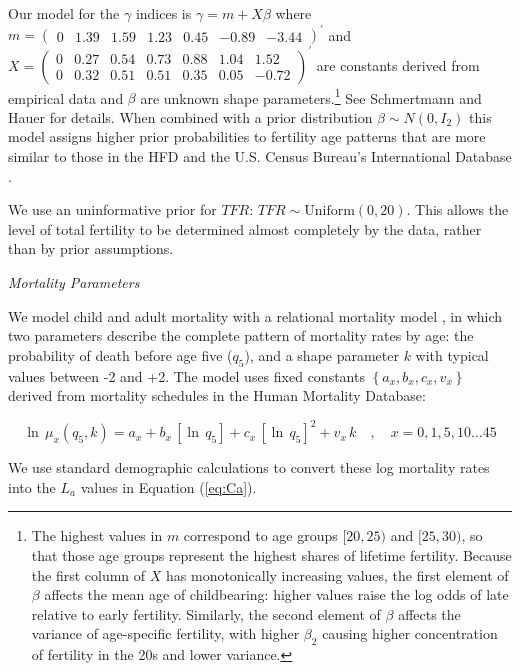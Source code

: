 \documentclass[12pt]{article}
\begin{document}
Our model for the \(\gamma\) indices is \(\gamma=m+X\beta\) where
\(m=(\begin{smallmatrix} 0 &1.39 &1.59 &1.23 &0.45 &-0.89 &-3.44\end{smallmatrix})^\prime\)
and
\(X= \left(\begin{smallmatrix}0 & 0.27 & 0.54 & 0.73 & 0.88 & 1.04 & 1.52\\0 & 0.32 & 0.51 & 0.51 & 0.35 & 0.05 & -0.72 \end{smallmatrix}\right)^{\prime}\)
are constants derived from empirical data and \(\beta\) are unknown
shape
parameters.\footnote{The highest values in $m$ correspond to age groups $[20,25)$ and $[25,30)$, so that those age groups represent the highest shares of lifetime fertility. Because the first column of $X$ has monotonically increasing values, the first element of $\beta$ affects the mean age of childbearing: higher values raise the log odds of late relative to early fertility. Similarly, the second element of $\beta$ affects the variance of age-specific fertility, with higher $\beta_2$ causing higher concentration of fertility in the 20s and lower variance.}
See Schmertmann and Hauer \citeyearpar{schmertmann2019bayesian} for
details. When combined with a prior distribution \(\beta\sim N(0,I_2)\)
this model assigns higher prior probabilities to fertility age patterns
that are more similar to those in the HFD and the U.S. Census Bureau's
International Database \citep{CensusIDB}.

We use an uninformative prior for \(TFR\):
\(TFR\sim \text{Uniform}(0,20)\). This allows the level of total
fertility to be determined almost completely by the data, rather than by
prior assumptions.

\emph{Mortality Parameters}

We model child and adult mortality with a relational mortality model
\citep{wilmoth2012flexible}, in which two parameters describe the
complete pattern of mortality rates by age: the probability of death
before age five (\(q_5\)), and a shape parameter \(k\) with typical
values between -2 and +2. The model uses fixed constants
\(\left\{a_x,b_x,c_x,v_x\right\}\) derived from mortality schedules in
the Human Mortality Database:

\begin{equation}
\ln\,\mu_{x}(q_{5},k) = a_{x}+b_{x}\,\left[\ln\, q_{5}\right]+c_{x}\,\left[\ln\, q_{5}\right]^{2}+v_{x}\, k\quad,\quad x=0,1,5,10 \ldots 45
\end{equation}

\noindent We use standard demographic calculations to convert these log
mortality rates into the \(L_{a}\) values in Equation (\ref{eq:Ca}).
\end{document}
